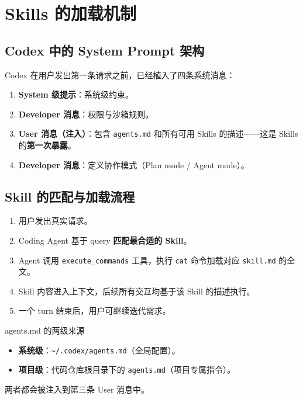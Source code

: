 \section{Skills 的加载机制}

\subsection{Codex 中的 System Prompt 架构}

Codex 在用户发出第一条请求之前，已经植入了四条系统消息：

\begin{enumerate}
    \item \textbf{System 级提示}：系统级约束。
    \item \textbf{Developer 消息}：权限与沙箱规则。
    \item \textbf{User 消息（注入）}：包含 \texttt{agents.md} 和所有可用 Skills 的描述——这是 Skills 的\textbf{第一次暴露}。
    \item \textbf{Developer 消息}：定义协作模式（Plan mode / Agent mode）。
\end{enumerate}

\subsection{Skill 的匹配与加载流程}

\begin{enumerate}
    \item 用户发出真实请求。
    \item Coding Agent 基于 query \textbf{匹配最合适的 Skill}。
    \item Agent 调用 \texttt{execute\_commands} 工具，执行 \texttt{cat} 命令加载对应 \texttt{skill.md} 的全文。
    \item Skill 内容进入上下文，后续所有交互均基于该 Skill 的描述执行。
    \item 一个 turn 结束后，用户可继续迭代需求。
\end{enumerate}

\begin{knowledgebox}{agents.md 的两级来源}
\begin{itemize}
    \item \textbf{系统级}：\texttt{\~{}/.codex/agents.md}（全局配置）。
    \item \textbf{项目级}：代码仓库根目录下的 \texttt{agents.md}（项目专属指令）。
\end{itemize}
两者都会被注入到第三条 User 消息中。
\end{knowledgebox}

